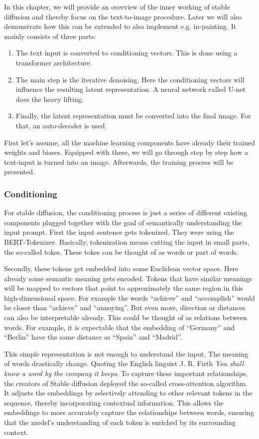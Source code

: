 \documentclass[11pt]{article}
\begin{document}
In this chapter, we will provide an overview of the inner working of stable diffusion and thereby focus on the text-to-image procedure. Later we will also demonstrate how this can be extended to also implement e.g. in-painting. It mainly consists of three parts:
\begin{enumerate}
    \item The text input is converted to conditioning vectors. This is done using a transformer architecture.
    \item The main step is the iterative denoising. Here the conditioning vectors will influence the resulting latent representation. A neural network called U-net does the heavy lifting.
    \item Finally, the latent representation must be converted into the final image. For that, an auto-decoder is used.
\end{enumerate}

First let's assume, all the machine learning components have already their trained weights and biases. Equipped with these, we will go through step by step how a text-input is turned into an image. Afterwards, the training process will be presented.

\subsubsection{Conditioning}
For stable diffusion, the conditioning process is just a series of different existing components plugged together with the goal of semantically understanding the input prompt. First the input sentence gets tokenized. They were using the BERT-Tokenizer\cite{devlin2019bert}. Basically, tokenization means cutting the input in small parts, the so-called tokes. These tokes can be thought of as words or part of words.

Secondly, these tokens get embedded into some Euclidean vector space. Here already some semantic meaning gets encoded. Tokens that have similar meanings will be mapped to vectors that point to approximately the same region in this high-dimensional space. For example the words “achieve” and “accomplish” would be closer than “achieve” and “annoying”. But even more, direction or distances can also be interpretable already. This could be thought of as relations between words. For example, it is expectable that the embedding of “Germany” and “Berlin” have the same distance as “Spain” and “Madrid”.

This simple representation is not enough to understand the input. The meaning of words drastically change. Quoting the English linguist J. R. Firth \textit{You shall know a word by the company it keeps}\cite{firth1962studiesinlinguisticanalysis}. To capture these important relationships, the creators of Stable diffusion deployed the so-called cross-attention algorithm\cite{vaswani2023attentionneed}. It adjusts the embeddings by selectively attending to other relevant tokens in the sequence, thereby incorporating contextual information. This allows the embeddings to more accurately capture the relationships between words, ensuring that the model's understanding of each token is enriched by its surrounding context.
\end{document}

